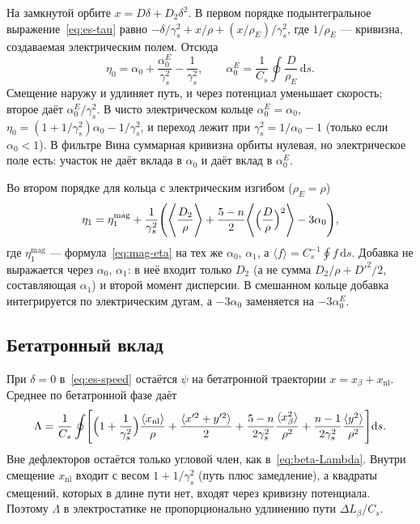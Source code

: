 На замкнутой орбите $x=D\delta+D_2\delta^2$. В первом порядке подынтегральное выражение~\eqref{eq:es-tau} равно $-\delta/\gamma_s^2+x/\rho+(x/\rho_E)/\gamma_s^2$, где $1/\rho_E$ --- кривизна, создаваемая электрическим полем. Отсюда
\begin{equation}
\label{eq:es-eta0}
\eta_0=\alpha_0+\frac{\alpha_0^E}{\gamma_s^2}-\frac{1}{\gamma_s^2},
\qquad
\alpha_0^E=\frac{1}{C_s}\oint\frac{D}{\rho_E}\,\mathrm{d}s .
\end{equation}
Смещение наружу и удлиняет путь, и через потенциал уменьшает скорость; второе даёт $\alpha_0^E/\gamma_s^2$. В чисто электрическом кольце $\alpha_0^E=\alpha_0$, $\eta_0=(1+1/\gamma_s^2)\alpha_0-1/\gamma_s^2$, и переход лежит при $\gamma_s^2=1/\alpha_0-1$ (только если $\alpha_0<1$). В фильтре Вина суммарная кривизна орбиты нулевая, но электрическое поле есть: участок не даёт вклада в $\alpha_0$ и даёт вклад в $\alpha_0^E$.

Во втором порядке для кольца с электрическим изгибом ($\rho_E=\rho$)
\begin{equation}
\label{eq:es-eta1}
\eta_1=\eta_1^{\mathrm{mag}}+\frac{1}{\gamma_s^2}\Biggl(\Biggl\langle\frac{D_2}{\rho}\Biggr\rangle+\frac{5-n}{2}\Biggl\langle\Bigl(\frac{D}{\rho}\Bigr)^2\Biggr\rangle-3\alpha_0\Biggr),
\end{equation}
где $\eta_1^{\mathrm{mag}}$ --- формула~\eqref{eq:mag-eta} на тех же $\alpha_0$, $\alpha_1$, а $\langle f\rangle=C_s^{-1}\oint f\,\mathrm{d}s$. Добавка не выражается через $\alpha_0$, $\alpha_1$: в неё входит только $D_2$ (а не сумма $D_2/\rho+D'^2/2$, составляющая $\alpha_1$) и второй момент дисперсии. В смешанном кольце добавка интегрируется по электрическим дугам, а $-3\alpha_0$ заменяется на $-3\alpha_0^E$.

\subsection{Бетатронный вклад}

При $\delta=0$ в~\eqref{eq:es-speed} остаётся $\psi$ на бетатронной траектории $x=x_\beta+x_{\mathrm{nl}}$. Среднее по бетатронной фазе даёт
\begin{equation}
\label{eq:es-lambda}
\Lambda=\frac{1}{C_s}\oint\Biggl[\Bigl(1+\frac{1}{\gamma_s^2}\Bigr)\frac{\langle x_{\mathrm{nl}}\rangle}{\rho}+\frac{\langle x'^2+y'^2\rangle}{2}+\frac{5-n}{2\gamma_s^2}\frac{\langle x_\beta^2\rangle}{\rho^2}+\frac{n-1}{2\gamma_s^2}\frac{\langle y^2\rangle}{\rho^2}\Biggr]\mathrm{d}s.
\end{equation}
Вне дефлекторов остаётся только угловой член, как в~\eqref{eq:beta-Lambda}. Внутри смещение $x_{\mathrm{nl}}$ входит с весом $1+1/\gamma_s^2$ (путь плюс замедление), а квадраты смещений, которых в длине пути нет, входят через кривизну потенциала. Поэтому $\Lambda$ в электростатике не пропорционально удлинению пути $\Delta L_\beta/C_s$.

